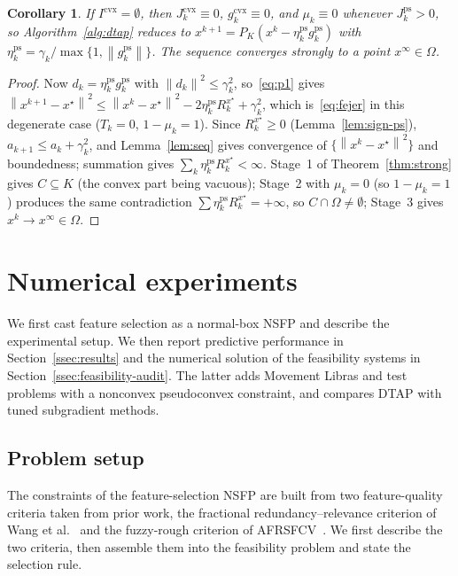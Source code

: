 \documentclass[]{interact}
\theoremstyle{plain}
\newtheorem{corollary}[theorem]{Corollary}
\theoremstyle{definition}
\theoremstyle{remark}
\newcommand{\norm}[1]{\left\lVert #1 \right\rVert}
\newcommand{\cvx}{\mathrm{cvx}}
\newcommand{\ps}{\mathrm{ps}}
\begin{document}
\begin{corollary}\label{cor:ps}
If $I^{\cvx}=\emptyset$, then $J^{\cvx}_k\equiv0$, $g^{\cvx}_k\equiv0$, and $\mu_k\equiv0$ whenever $J^{\ps}_k>0$, so Algorithm~\ref{alg:dtap} reduces to $x^{k+1}=P_K(x^k-\eta^{\ps}_k g^{\ps}_k)$ with $\eta^{\ps}_k=\gamma_k/\max\{1,\norm{g^{\ps}_k}\}$. The sequence converges strongly to a point $x^\infty\in\Omega$.
\end{corollary}
\begin{proof}
Now $d_k=\eta^{\ps}_k g^{\ps}_k$ with $\norm{d_k}^2\le\gamma_k^2$, so~\eqref{eq:p1} gives $\norm{x^{k+1}-x^\star}^2\le\norm{x^k-x^\star}^2-2\eta^{\ps}_k R^{x^\star}_k+\gamma_k^2$, which is~\eqref{eq:fejer} in this degenerate case ($T_k=0$, $1-\mu_k=1$). Since $R^{x^\star}_k\ge0$ (Lemma~\ref{lem:sign-ps}), $a_{k+1}\le a_k+\gamma_k^2$, and Lemma~\ref{lem:seq} gives convergence of $\{\norm{x^k-x^\star}^2\}$ and boundedness; summation gives $\sum_k\eta^{\ps}_k R^{x^\star}_k<\infty$. Stage~1 of Theorem~\ref{thm:strong} gives $C\subseteq K$ (the convex part being vacuous); Stage~2 with $\mu_k=0$ (so $1-\mu_k=1$) produces the same contradiction $\sum\eta^{\ps}_k R^{x^\star}_k=+\infty$, so $C\cap\Omega\ne\emptyset$; Stage~3 gives $x^k\to x^\infty\in\Omega$.
\end{proof}


\section{Numerical experiments}\label{sec:experiments}
We first cast feature selection as a normal-box NSFP and describe the experimental setup. We then report predictive performance in Section~\ref{ssec:results} and the numerical solution of the feasibility systems in Section~\ref{ssec:feasibility-audit}. The latter adds Movement Libras and test problems with a nonconvex pseudoconvex constraint, and compares DTAP with tuned subgradient methods.

\subsection{Problem setup}\label{sec:fs}
The constraints of the feature-selection NSFP are built from two feature-quality criteria taken from prior work, the fractional redundancy--relevance criterion of Wang et al.~\citep{wang2021fractional} and the fuzzy-rough criterion of AFRSFCV~\citep{wang2026afrsfcv}. We first describe the two criteria, then assemble them into the feasibility problem and state the selection rule.
\end{document}
